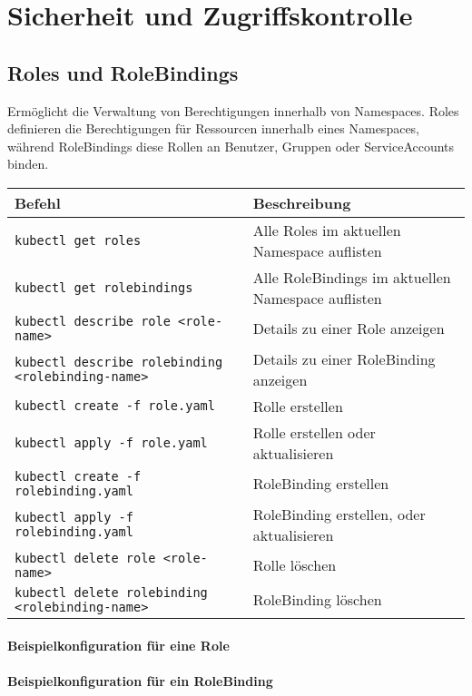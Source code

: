 \chapter{Sicherheit und Zugriffskontrolle}

\section{Roles und RoleBindings}
Ermöglicht die Verwaltung von Berechtigungen innerhalb von Namespaces. Roles definieren die Berechtigungen für Ressourcen innerhalb eines Namespaces, während RoleBindings diese Rollen an Benutzer, Gruppen oder ServiceAccounts binden.\\

\noindent
\begin{tabularx}{\textwidth}{|X|X|}
\hline
\textbf{Befehl} & \textbf{Beschreibung} \\
\hline
\texttt{kubectl get roles} & Alle Roles im aktuellen Namespace auflisten \\
\texttt{kubectl get rolebindings} & Alle RoleBindings im aktuellen Namespace auflisten \\
\texttt{kubectl describe role <role-name>} & Details zu einer Role anzeigen \\
\texttt{kubectl describe rolebinding <rolebinding-name>} & Details zu einer RoleBinding anzeigen \\
\texttt{kubectl create -f role.yaml} & Rolle erstellen\\
\texttt{kubectl apply -f role.yaml} & Rolle erstellen oder aktualisieren\\
\texttt{kubectl create -f rolebinding.yaml} & RoleBinding erstellen\\
\texttt{kubectl apply -f rolebinding.yaml} & RoleBinding erstellen, oder aktualisieren\\
\texttt{kubectl delete role <role-name>} & Rolle löschen \\
\texttt{kubectl delete rolebinding <rolebinding-name>} & RoleBinding löschen \\
\hline
\end{tabularx}

\subsubsection{Beispielkonfiguration für eine Role}


\subsubsection{Beispielkonfiguration für ein RoleBinding}


